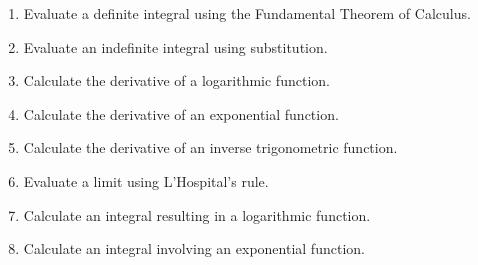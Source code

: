 \documentclass[12pt,landscape]{article}
\begin{document}
\begin{multicols}{2}
\begin{enumerate}
\item Evaluate a definite integral using the Fundamental Theorem of Calculus.\\
\item Evaluate an indefinite integral using substitution.\\
\item Calculate the derivative of a logarithmic function.\\
\item Calculate the derivative of an exponential function.\\
\item Calculate the derivative of an inverse trigonometric function.\\
\item Evaluate a limit using L'Hospital's rule.\\
\item Calculate an integral resulting in a logarithmic function.\\
\item Calculate an integral involving an exponential function.\\
%
\end{enumerate}
\newpage 

\end{multicols}
\end{document}
